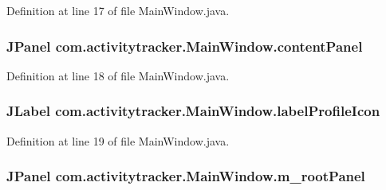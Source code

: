 Definition at line 17 of file Main\+Window.\+java.

\subsubsection[{\texorpdfstring{content\+Panel}{contentPanel}}]{\setlength{\rightskip}{0pt plus 5cm}J\+Panel com.\+activitytracker.\+Main\+Window.\+content\+Panel\hspace{0.3cm}{\ttfamily [private]}}\hypertarget{classcom_1_1activitytracker_1_1_main_window_aaa5ce3b10bff65231c65a3d4b33724b0}{}\label{classcom_1_1activitytracker_1_1_main_window_aaa5ce3b10bff65231c65a3d4b33724b0}


Definition at line 18 of file Main\+Window.\+java.

\subsubsection[{\texorpdfstring{label\+Profile\+Icon}{labelProfileIcon}}]{\setlength{\rightskip}{0pt plus 5cm}J\+Label com.\+activitytracker.\+Main\+Window.\+label\+Profile\+Icon\hspace{0.3cm}{\ttfamily [private]}}\hypertarget{classcom_1_1activitytracker_1_1_main_window_a05a555ba49d30b00573d07e5acd39e0a}{}\label{classcom_1_1activitytracker_1_1_main_window_a05a555ba49d30b00573d07e5acd39e0a}


Definition at line 19 of file Main\+Window.\+java.

\subsubsection[{\texorpdfstring{m\+\_\+root\+Panel}{m_rootPanel}}]{\setlength{\rightskip}{0pt plus 5cm}J\+Panel com.\+activitytracker.\+Main\+Window.\+m\+\_\+root\+Panel\hspace{0.3cm}{\ttfamily [private]}}\hypertarget{classcom_1_1activitytracker_1_1_main_window_ac3d61c032aef87f12b1ae6f7dbf482c3}{}\label{classcom_1_1activitytracker_1_1_main_window_ac3d61c032aef87f12b1ae6f7dbf482c3}


